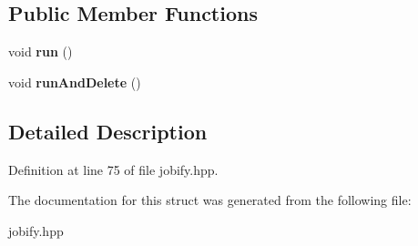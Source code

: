\subsection*{Public Member Functions}
\begin{DoxyCompactItemize}
\item 
\hypertarget{struct_thread_job_a3db7a86ca4c03924cc693416a7fef240}{void {\bfseries run} ()}\label{struct_thread_job_a3db7a86ca4c03924cc693416a7fef240}

\item 
\hypertarget{struct_thread_job_af1f2c090908c3df0cc55c102b7cb11ae}{void {\bfseries run\-And\-Delete} ()}\label{struct_thread_job_af1f2c090908c3df0cc55c102b7cb11ae}

\end{DoxyCompactItemize}


\subsection{Detailed Description}


Definition at line 75 of file jobify.\-hpp.



The documentation for this struct was generated from the following file\-:\begin{DoxyCompactItemize}
\item 
jobify.\-hpp\end{DoxyCompactItemize}
